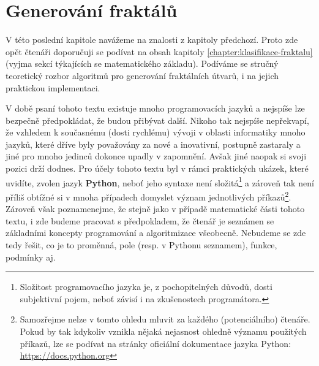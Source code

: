 \chapter{Generování fraktálů}\label{chapter:generovani-fraktalu}

V této poslední kapitole navážeme na znalosti z kapitoly předchozí. Proto zde opět čtenáři doporučuji se podívat na obsah kapitoly \ref{chapter:klasifikace-fraktalu} (vyjma sekcí týkajících se matematického základu). Podíváme se stručný teoretický rozbor algoritmů pro generování fraktálních útvarů, i na jejich praktickou implementaci.

V době psaní tohoto textu existuje mnoho programovacích jazyků a nejspíše lze bezpečně předpokládat, že budou přibývat další. Nikoho tak nejspíše nepřekvapí, že vzhledem k současnému (dosti rychlému) vývoji v oblasti informatiky mnoho jazyků, které dříve byly považovány za nové a inovativní, postupně zastaraly a jiné pro mnoho jedinců dokonce upadly v zapomnění. Avšak jiné naopak si svoji pozici drží dodnes. Pro účely tohoto textu byl v rámci praktických ukázek, které uvidíte, zvolen jazyk \textbf{Python}, neboť jeho syntaxe není složitá\footnote{Složitost programovacího jazyka je, z pochopitelných důvodů, dosti subjektivní pojem, neboť závisí i na zkušenostech programátora.} a zároveň tak není příliš obtížné si v mnoha případech domyslet význam jednotlivých příkazů\footnote{Samozřejme nelze v tomto ohledu mluvit za každého (potenciálního) čtenáře. Pokud by tak kdykoliv vznikla nějaká nejasnost ohledně významu použitých příkazů, lze se podívat na stránky oficiální dokumentace jazyka Python: \url{https://docs.python.org}}. Zároveň však poznamenejme, že stejně jako v případě matematické části tohoto textu, i zde budeme pracovat s předpokladem, že čtenář je seznámen se základními koncepty programování a algoritmizace všeobecně. Nebudeme se zde tedy řešit, co je to proměnná, pole (resp. v Pythonu seznamem), funkce, podmínky aj.

